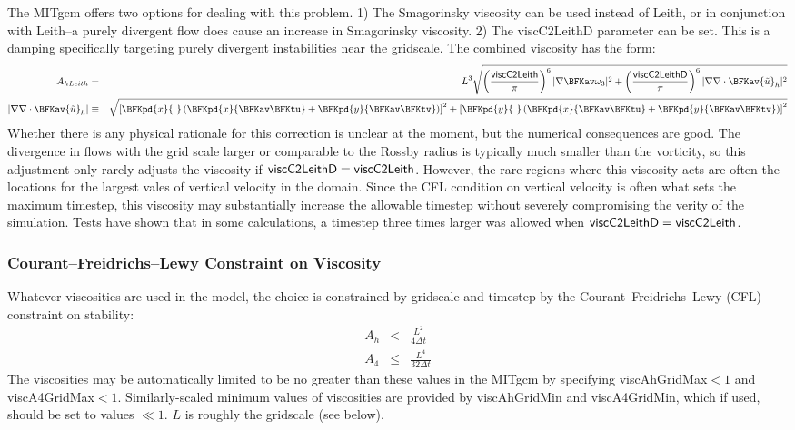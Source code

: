 The MITgcm offers two options for dealing with this problem.  1) The
Smagorinsky viscosity can be used instead of Leith, or in conjunction
with Leith--a purely divergent flow does cause an increase in
Smagorinsky viscosity.  2) The {\sf viscC2LeithD} parameter can be
set.  This is a damping specifically targeting purely divergent
instabilities near the gridscale.  The combined viscosity has the
form:
\begin{eqnarray}
A_{hLeith} & = & 
L^3\sqrt{\left(\frac{{\sf viscC2Leith}}{\pi}\right)^6
  |\nabla \BFKav \omega_3|^2
  +\left(\frac{{\sf viscC2LeithD}}{\pi}\right)^6
  |\nabla \nabla\cdot \BFKav {\tilde u}_h|^2} \\
|\nabla \nabla\cdot \BFKav {\tilde u}_h| & \equiv & 
\sqrt{\left[\BFKpd{x}{\ }\left(\BFKpd{x}{\BFKav \BFKtu}
      +\BFKpd{y}{\BFKav \BFKtv}\right)\right]^2
  +\left[\BFKpd{y}{\ }\left(\BFKpd{x}{\BFKav \BFKtu}
      +\BFKpd{y}{\BFKav \BFKtv}\right)\right]^2}
\end{eqnarray}
Whether there is any physical rationale for this correction is unclear
at the moment, but the numerical consequences are good.  The
divergence in flows with the grid scale larger or comparable to the
Rossby radius is typically much smaller than the vorticity, so this
adjustment only rarely adjusts the viscosity if ${\sf
  viscC2LeithD}={\sf viscC2Leith}$.  However, the rare regions where
this viscosity acts are often the locations for the largest vales of
vertical velocity in the domain.  Since the CFL condition on vertical
velocity is often what sets the maximum timestep, this viscosity may
substantially increase the allowable timestep without severely
compromising the verity of the simulation.  Tests have shown that in
some calculations, a timestep three times larger was allowed when
${\sf viscC2LeithD}={\sf viscC2Leith}$.

\subsubsection{Courant--Freidrichs--Lewy Constraint on Viscosity}
Whatever viscosities are used in the model, the choice is constrained
by gridscale and timestep by the Courant--Freidrichs--Lewy (CFL)
constraint on stability:
\begin{eqnarray}
A_h & < & \frac{L^2}{4\Delta t} \\
A_4 & \le & \frac{L^4}{32\Delta t}
\end{eqnarray}
The viscosities may be automatically limited to be no greater than
these values in the MITgcm by specifying {\sf viscAhGridMax}$<1$ and
{\sf viscA4GridMax}$<1$.  Similarly-scaled minimum values of
viscosities are provided by {\sf viscAhGridMin} and {\sf
  viscA4GridMin}, which if used, should be set to values $\ll 1$. $L$
is roughly the gridscale (see below).

